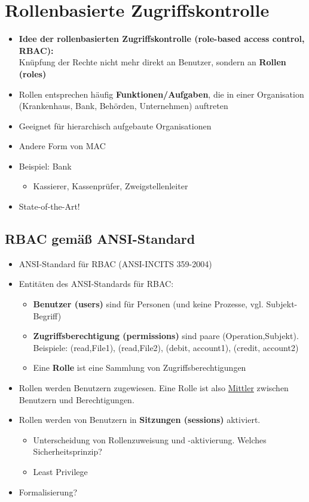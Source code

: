 \documentclass[openany]{book}
\begin{document}
\section{Rollenbasierte Zugriffskontrolle}

\begin{itemize}
    \item \textbf{Idee der rollenbasierten Zugriffskontrolle (role-based access control, RBAC):} \\ Knüpfung der Rechte nicht mehr direkt an Benutzer, sondern an \textbf{Rollen (roles)}
    \item Rollen entsprechen häufig \textbf{Funktionen/Aufgaben}, die in einer Organisation (Krankenhaus, Bank, Behörden, Unternehmen) auftreten
    \item Geeignet für hierarchisch aufgebaute Organisationen
    \item Andere Form von MAC
    \item Beispiel: Bank
    \begin{itemize}
        \item Kassierer, Kassenprüfer, Zweigstellenleiter
    \end{itemize}
    \item State-of-the-Art!
\end{itemize}

\subsection{RBAC gemäß ANSI-Standard}

\begin{itemize}
    \item ANSI-Standard für RBAC (ANSI-INCITS 359-2004)
    \item Entitäten des ANSI-Standards für RBAC:
    \begin{itemize}
        \item \textbf{Benutzer (users)} sind für Personen (und keine Prozesse, vgl. Subjekt-Begriff)
        \item \textbf{Zugriffsberechtigung (permissions)} sind paare (Operation,Subjekt). \\ Beispiele: (read,File1), (read,File2), (debit, account1), (credit, account2)
        \item Eine \textbf{Rolle} ist eine Sammlung von Zugriffsberechtigungen
    \end{itemize}
    \item Rollen werden Benutzern zugewiesen. Eine Rolle ist also \underline{Mittler} zwischen Benutzern und Berechtigungen.
    \item Rollen werden von Benutzern in \textbf{Sitzungen (sessions)} aktiviert.
    \begin{itemize}
        \item Unterscheidung von Rollenzuweisung und -aktivierung. Welches Sicherheitsprinzip?
        \item Least Privilege
    \end{itemize}
    \item Formalisierung?
\end{itemize}
\end{document}

